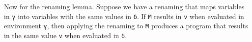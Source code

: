 Now for the renaming lemma. Suppose we have a renaming that maps
variables in \texttt{γ} into variables with the same values in
\texttt{δ}. If \texttt{M} results in \texttt{v} when evaluated in
environment \texttt{γ}, then applying the renaming to \texttt{M}
produces a program that results in the same value \texttt{v} when
evaluated in \texttt{δ}.

\begin{fence}
\begin{code}%
\>[0]\AgdaSpace{}%
\AgdaSymbol{:}\AgdaSpace{}%
\AgdaSpace{}%
\AgdaSymbol{\{}\AgdaSpace{}%
\AgdaSpace{}%
\AgdaSymbol{\}}\AgdaSpace{}%
\AgdaSymbol{\{}\AgdaSpace{}%
\AgdaSymbol{:}\AgdaSpace{}%
\AgdaSpace{}%
\AgdaSymbol{\}}\AgdaSpace{}%
\AgdaSymbol{\{}\AgdaSpace{}%
\AgdaSymbol{:}\AgdaSpace{}%
\AgdaSpace{}%
\AgdaSymbol{\}}\AgdaSpace{}%
\AgdaSymbol{\{}\AgdaSpace{}%
\AgdaSymbol{:}\AgdaSpace{}%
\AgdaSpace{}%
\AgdaSpace{}%
\AgdaSymbol{\}}\<%
\\
\>[0][@{}l@{\AgdaIndent{0}}]%
\>[2]\AgdaSpace{}%
\AgdaSymbol{(}\AgdaSpace{}%
\AgdaSymbol{:}\AgdaSpace{}%
\AgdaSpace{}%
\AgdaSpace{}%
\AgdaSymbol{)}\<%
\\
%
\>[2]\AgdaSpace{}%
\AgdaSpace{}%
\AgdaSpace{}%
\AgdaSymbol{(}\AgdaSpace{}%
\AgdaSpace{}%
\AgdaSymbol{)}\<%
\\
%
\>[2]%
\>[1382I]\AgdaSpace{}%
\AgdaSpace{}%
\AgdaSpace{}%
\AgdaSpace{}%
\<%
\\
\>[.][@{}l@{}]\<[1382I]%
\>[4]\AgdaComment{---------------------}\<%
\\
%
\>[2]\AgdaSpace{}%
\AgdaSpace{}%
\AgdaSpace{}%
\AgdaSymbol{(}\AgdaSpace{}%
\AgdaSpace{}%
\AgdaSymbol{)}\AgdaSpace{}%
\AgdaSpace{}%
\<%
\\
\>[0]\AgdaSpace{}%
\AgdaSpace{}%
\AgdaSpace{}%
\AgdaSymbol{(}\AgdaSpace{}%

\end{code}
\end{fence}
